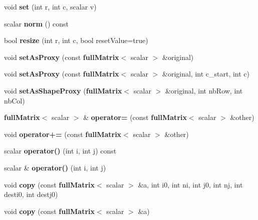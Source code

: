 \begin{DoxyCompactItemize}
\item 
void {\bfseries set} (int r, int c, scalar v)\label{classfullMatrix_a735f82b112020b39d9d93605d1eae8d5}

\item 
scalar {\bfseries norm} () const \label{classfullMatrix_a9381333d7486f0b3085a89a50c6b845c}

\item 
bool {\bfseries resize} (int r, int c, bool reset\-Value=true)\label{classfullMatrix_a8d0af3903c823e1666eebfc9f44647bc}

\item 
void {\bfseries set\-As\-Proxy} (const {\bf full\-Matrix}$<$ scalar $>$ \&original)\label{classfullMatrix_a644b05b2a68abe1a3f2bbb69803e18e2}

\item 
void {\bfseries set\-As\-Proxy} (const {\bf full\-Matrix}$<$ scalar $>$ \&original, int c\-\_\-start, int c)\label{classfullMatrix_aa2be7cb032b3389a1f8afd5f52e8682a}

\item 
void {\bfseries set\-As\-Shape\-Proxy} ({\bf full\-Matrix}$<$ scalar $>$ \&original, int nb\-Row, int nb\-Col)\label{classfullMatrix_a7a11045f7597bbc012aa885900e22605}

\item 
{\bf full\-Matrix}$<$ scalar $>$ \& {\bfseries operator=} (const {\bf full\-Matrix}$<$ scalar $>$ \&other)\label{classfullMatrix_a81db22de4219a23eca151b91a3fd63ae}

\item 
void {\bfseries operator+=} (const {\bf full\-Matrix}$<$ scalar $>$ \&other)\label{classfullMatrix_a1a6073f2973475def36a539c7ac5841e}

\item 
scalar {\bfseries operator()} (int i, int j) const \label{classfullMatrix_a86b846a5fe83e189a0681d70b1da8f45}

\item 
scalar \& {\bfseries operator()} (int i, int j)\label{classfullMatrix_a0e0316ca46021548332a2cf027b06e1b}

\item 
void {\bfseries copy} (const {\bf full\-Matrix}$<$ scalar $>$ \&a, int i0, int ni, int j0, int nj, int desti0, int destj0)\label{classfullMatrix_ae1460aa1d835bec0da787b4a3bd143f1}

\item 
void {\bfseries copy} (const {\bf full\-Matrix}$<$ scalar $>$ \&a)\label{classfullMatrix_aa7f217d03d086d97900ad96bf282ebf5}


\end{DoxyCompactItemize}
